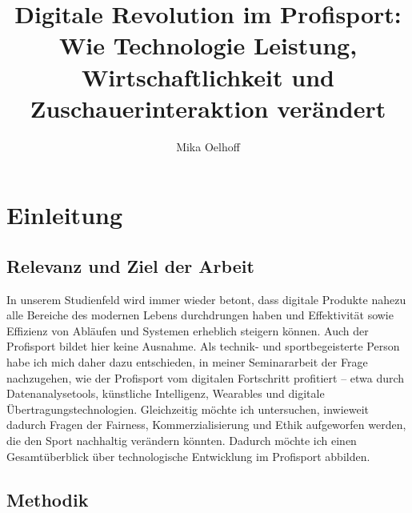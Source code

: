\documentclass[
  number]{elsarticle}
\renewcommand*\contentsname{Table of contents}
\newcommand\contentsname{Table of contents}
\begin{document}
\begin{frontmatter}
\title{Digitale Revolution im Profisport: Wie Technologie Leistung,
Wirtschaftlichkeit und Zuschauerinteraktion verändert}
\author[]{Mika Oelhoff%
%
}




        





\end{frontmatter}
    

\hypersetup{
    colorlinks=true,
    linkcolor=black,
    urlcolor=blue,
    citecolor=blue
}
\renewcommand{\contentsname}{}
\tableofcontents

\section{Einleitung}\label{einleitung}

\subsection{Relevanz und Ziel der
Arbeit}\label{relevanz-und-ziel-der-arbeit}

In unserem Studienfeld wird immer wieder betont, dass digitale Produkte
nahezu alle Bereiche des modernen Lebens durchdrungen haben und
Effektivität sowie Effizienz von Abläufen und Systemen erheblich
steigern können. Auch der Profisport bildet hier keine Ausnahme. Als
technik- und sportbegeisterte Person habe ich mich daher dazu
entschieden, in meiner Seminararbeit der Frage nachzugehen, wie der
Profisport vom digitalen Fortschritt profitiert -- etwa durch
Datenanalysetools, künstliche Intelligenz, Wearables und digitale
Übertragungstechnologien. Gleichzeitig möchte ich untersuchen, inwieweit
dadurch Fragen der Fairness, Kommerzialisierung und Ethik aufgeworfen
werden, die den Sport nachhaltig verändern könnten. Dadurch möchte ich
einen Gesamtüberblick über technologische Entwicklung im Profisport
abbilden.

\subsection{Methodik}\label{methodik}
\end{document}
